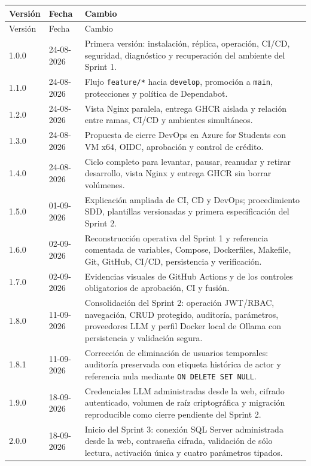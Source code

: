 \documentclass[11pt,letterpaper]{article}
\newcommand{\file}[1]{\texttt{#1}}
\begin{document}
\begin{longtable}{@{}p{}p{}p{}@{}}
  \toprule
  Versión & Fecha & Cambio \\
  \midrule
  \endfirsthead
  \toprule
  Versión & Fecha & Cambio \\
  \midrule
  \endhead
  1.0.0 & 24-08-2026 & Primera versión: instalación, réplica, operación, CI/CD, seguridad, diagnóstico y recuperación del ambiente del Sprint 1. \\
  1.1.0 & 24-08-2026 & Flujo \file{feature/*} hacia \file{develop}, promoción a \file{main}, protecciones y política de Dependabot. \\
  1.2.0 & 24-08-2026 & Vista Nginx paralela, entrega GHCR aislada y relación entre ramas, CI/CD y ambientes simultáneos. \\
  1.3.0 & 24-08-2026 & Propuesta de cierre DevOps en Azure for Students con VM x64, OIDC, aprobación y control de crédito. \\
  1.4.0 & 24-08-2026 & Ciclo completo para levantar, pausar, reanudar y retirar desarrollo, vista Nginx y entrega GHCR sin borrar volúmenes. \\
  1.5.0 & 01-09-2026 & Explicación ampliada de CI, CD y DevOps; procedimiento SDD, plantillas versionadas y primera especificación del Sprint 2. \\
  1.6.0 & 02-09-2026 & Reconstrucción operativa del Sprint 1 y referencia comentada de variables, Compose, Dockerfiles, Makefile, Git, GitHub, CI/CD, persistencia y verificación. \\
  1.7.0 & 02-09-2026 & Evidencias visuales de GitHub Actions y de los controles obligatorios de aprobación, CI y fusión. \\
  1.8.0 & 11-09-2026 & Consolidación del Sprint 2: operación JWT/RBAC, navegación, CRUD protegido, auditoría, parámetros, proveedores LLM y perfil Docker local de Ollama con persistencia y validación segura. \\
  1.8.1 & 11-09-2026 & Corrección de eliminación de usuarios temporales: auditoría preservada con etiqueta histórica de actor y referencia nula mediante \file{ON DELETE SET NULL}. \\
  1.9.0 & 18-09-2026 & Credenciales LLM administradas desde la web, cifrado autenticado, volumen de raíz criptográfica y migración reproducible como cierre pendiente del Sprint 2. \\
  2.0.0 & 18-09-2026 & Inicio del Sprint 3: conexión SQL Server administrada desde la web, contraseña cifrada, validación de sólo lectura, activación única y cuatro parámetros tipados. \\

\end{longtable}
\end{document}
